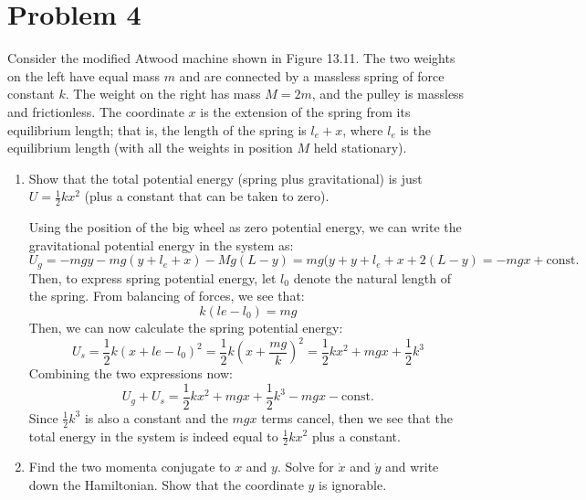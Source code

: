 \documentclass[10pt]{article}
\begin{document}
	\pagebreak

	\section*{Problem 4}
	Consider the modified Atwood machine shown in Figure 13.11. The two weights on the left have equal mass $m$
	and are connected by a massless spring of force constant $k$. The weight on the right has mass $M = 2m$,
	and the pulley is massless and frictionless. The coordinate $x$ is the extension of the spring from 
	its equilibrium length; that is, the length of the spring is $l_e + x$, where $l_e$ is the equilibrium
	length (with all the weights in position $M$ held stationary). 

	\begin{enumerate}[label=\alph*)]
		\item Show that the total potential energy (spring plus gravitational) is just $U = \frac{1}{2}kx^2$
			(plus a constant that can be taken to zero). 

			\begin{solution}
				Using the position of the big wheel as zero potential energy, we can write the gravitational potential
				energy in the system as:
				\[
					U_g = -mgy - mg(y + l_e + x) - Mg(L - y) = mg(y + y + l_e + x + 2(L - y) = -mgx + \text{const.}
				\] 
				Then, to express spring potential energy, let $l_0$ denote the natural length of the spring. 
				From balancing of forces, we see that: 
				\[
				k(le - l_0) = mg
				\] 
				Then, we can now calculate the spring potential energy:
				\[
				U_s = \frac{1}{2}k(x + le - l_0)^2 = \frac{1}{2}k\left( x + \frac{mg}{k} \right)^2 = \frac{1}{2}
				kx^2 + mgx + \frac{1}{2}k^3
				\] 
				Combining the two expressions now:
				\[
					U_g + U_s = \frac{1}{2}kx^2 + mgx + \frac{1}{2}k^3 - mgx - \text{const.}
				\] 
				Since $\frac{1}{2}k^3$ is also a constant and the $mgx$ terms cancel, then we see that the total
				energy in the system is indeed equal to $\frac{1}{2}kx^2$ plus a constant. 
			\end{solution}
		\item Find the two momenta conjugate to $x$ and $y$. Solve for $\dot x$ and $\dot y$ and write down 
			the Hamiltonian. Show that the coordinate $y$ is ignorable. 


\end{enumerate}
\end{document}
